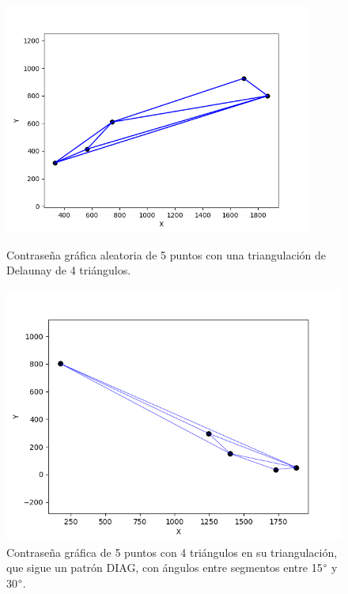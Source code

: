 \documentclass[12pt]{report}
\begin{document}
	\begin{figure}[h]
	\centering
	\begin{minipage}{0.45\textwidth}
		\centering
		\includegraphics[width=0.9\textwidth]{alea4td.png}
		\caption{Contraseña gráfica aleatoria de 5 puntos con una triangulación de Delaunay de 4 triángulos.}
		\label{4TD}
		
	\end{minipage}\hfill
	\begin{minipage}{0.45\textwidth}
		\centering
		\includegraphics[width=0.9\linewidth]{4td30.png}  %
		\caption{Contraseña gráfica de 5 puntos con 4 triángulos en su triangulación, que sigue un patrón DIAG, con ángulos entre segmentos entre 15$\degree$ y 30$\degree$.}
		\label{4td30}
	\end{minipage}
\end{figure}
\end{document}
